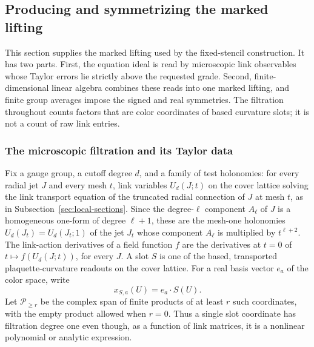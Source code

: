 \subsection{Producing and symmetrizing the marked lifting}
\label{sec:marked-campaign-producer}

This section supplies the marked lifting used by the fixed-stencil construction.
It has two parts. First, the equation ideal is read by microscopic link
observables whose Taylor errors lie strictly above the requested grade.
Second, finite-dimensional linear algebra combines these reads into one
marked lifting, and finite group averages impose the signed and real symmetries.
The filtration throughout counts factors that are color coordinates of
based curvature slots; it is not a count of raw link entries.

\subsubsection{The microscopic filtration and its Taylor data}

Fix a gauge group, a cutoff degree $d$, and a family of test holonomies:
for every radial jet $J$ and every mesh $t$, link variables $U_d(J;t)$ on
the cover lattice solving the link transport equation of the truncated
radial connection of $J$ at mesh $t$, as in
Subsection~\ref{sec:local-sections}. Since the degree-$\ell$ component
$A_\ell$ of $J$ is a homogeneous one-form of degree $\ell+1$, these are
the mesh-one holonomies $U_d(J_t)=U_d(J_t;1)$ of the jet $J_t$ whose
component $A_\ell$ is multiplied by $t^{\ell+2}$. The link-action
derivatives of a field function $f$ are the derivatives at $t=0$ of
$t\mapsto f(U_d(J;t))$, for every $J$. A
slot $S$ is one of the based, transported plaquette-curvature readouts on
the cover lattice. For a real basis vector $e_a$ of the color space, write
\[
              x_{S,a}(U)= e_a\mathbin{\cdot} S(U).
\]
Let $\mathcal P_{\geq r}$ be the complex span of finite products of at
least $r$ such coordinates, with the empty product allowed when $r=0$.
Thus a single slot coordinate has filtration degree one even though, as a
function of link matrices, it is a nonlinear polynomial or analytic
expression.

